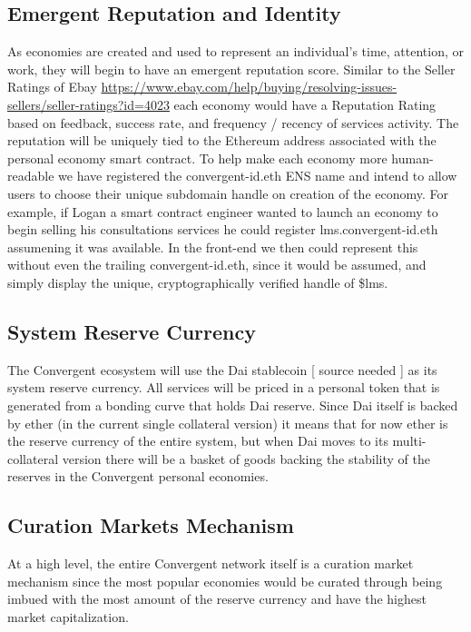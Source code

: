 \documentclass[a4paper, 10pt]{article}
\begin{document}
\subsection{Emergent Reputation and Identity}

As economies are created and used to represent an individual’s time, attention, or work, they will begin to have an emergent reputation score. Similar to the Seller Ratings of Ebay \url{https://www.ebay.com/help/buying/resolving-issues-sellers/seller-ratings?id=4023} each economy would have a Reputation Rating based on feedback, success rate, and frequency / recency of services activity. The reputation will be uniquely tied to the Ethereum address associated with the personal economy smart contract. To help make each economy more human-readable we have registered the convergent-id.eth ENS name and intend to allow users to choose their unique subdomain handle on creation of the economy. For example, if Logan a smart contract engineer wanted to launch an economy to begin selling his consultations services he could register lms.convergent-id.eth assumening it was available. In the front-end we then could represent this without even the trailing convergent-id.eth, since it would be assumed, and simply display the unique, cryptographically verified handle of \$lms. 

\subsection{System Reserve Currency}

The Convergent ecosystem will use the Dai stablecoin [ source needed ] as its system reserve currency. All services will be priced in a personal token that is generated from a bonding curve that holds Dai reserve. Since Dai itself is backed by ether (in the current single collateral version) it means that for now ether is the reserve currency of the entire system, but when Dai moves to its multi-collateral version there will be a basket of goods backing the stability of the reserves in the Convergent personal economies.

\subsection{Curation Markets Mechanism}

At a high level, the entire Convergent network itself is a curation market mechanism since the most popular economies would be curated through being imbued with the most amount of the reserve currency and have the highest market capitalization. 
\end{document}
